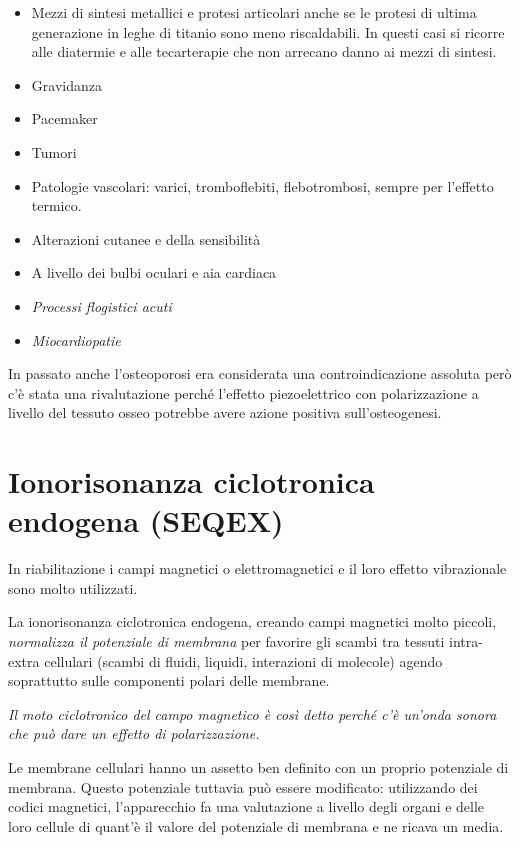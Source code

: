 \begin{itemize}
\item
  Mezzi di sintesi metallici e protesi articolari anche se le protesi di
  ultima generazione in leghe di titanio sono meno riscaldabili. In
  questi casi si ricorre alle diatermie e alle tecarterapie che non
  arrecano danno ai mezzi di sintesi.
\item
  Gravidanza
\item
  Pacemaker
\item
  Tumori
\item
  Patologie vascolari: varici, tromboflebiti, flebotrombosi, sempre per
  l'effetto termico.
\item
  Alterazioni cutanee e della sensibilità
\item
  A livello dei bulbi oculari e aia cardiaca
\item
  \emph{Processi flogistici acuti}
\item
  \emph{Miocardiopatie}
\end{itemize}

In passato anche l'osteoporosi era considerata una controindicazione
assoluta però c'è stata una rivalutazione perché l'effetto
piezoelettrico con polarizzazione a livello del tessuto osseo potrebbe
avere azione positiva sull'osteogenesi.

\section{Ionorisonanza ciclotronica endogena (SEQEX)}

In riabilitazione i campi magnetici o elettromagnetici e il loro effetto
vibrazionale sono molto utilizzati.

La ionorisonanza ciclotronica endogena, creando campi magnetici molto
piccoli, \emph{normalizza il potenziale di membrana} per favorire gli
scambi tra tessuti intra-extra cellulari (scambi di fluidi, liquidi,
interazioni di molecole) agendo soprattutto sulle componenti polari
delle membrane.

\emph{Il moto ciclotronico del campo magnetico è così detto perché c'è
un'onda sonora che può dare un effetto di polarizzazione.}

Le membrane cellulari hanno un assetto ben definito con un proprio
potenziale di membrana. Questo potenziale tuttavia può essere
modificato: utilizzando dei codici magnetici, l'apparecchio fa una
valutazione a livello degli organi e delle loro cellule di quant'è il
valore del potenziale di membrana e ne ricava un media.

